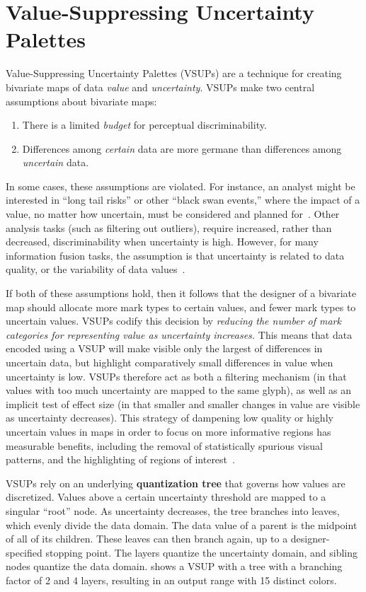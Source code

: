 \section{Value-Suppressing Uncertainty Palettes}
Value-Suppressing Uncertainty Palettes (VSUPs) are a technique for creating bivariate maps of data \emph{value} and \emph{uncertainty}. VSUPs make two central assumptions about bivariate maps:

\begin{enumerate}
	\item There is a limited \emph{budget} for perceptual discriminability.
	\item Differences among \emph{certain} data are more germane than differences among \emph{uncertain} data.
\end{enumerate}

In some cases, these assumptions are violated. For instance, an analyst might be interested in ``long tail risks'' or other ``black swan events,'' where the impact of a value, no matter how uncertain, must be considered and planned for~\cite{taleb2011black}. Other analysis tasks (such as filtering out outliers), require increased, rather than decreased, discriminability when uncertainty is high. However, for many information fusion tasks, the assumption is that uncertainty is related to data quality, or the variability of data values~\cite{riveiro2007evaluation}.

If both of these assumptions hold, then it follows that the designer of a bivariate map should allocate more mark types to certain values, and fewer mark types to uncertain values. VSUPs codify this decision by \emph{reducing the number of mark categories for representing value as uncertainty increases.} This means that data encoded using a VSUP will make visible only the largest of differences in uncertain data, but highlight comparatively small differences in value when uncertainty is low. VSUPs therefore act as both a filtering mechanism (in that values with too much uncertainty are mapped to the same glyph), as well as an implicit test of effect size (in that smaller and smaller changes in value are visible as uncertainty decreases). This strategy of dampening low quality or highly uncertain values in maps in order to focus on more informative regions has measurable benefits, including the removal of statistically spurious visual patterns, and the highlighting of regions of interest~\cite{correll2017surprise}.

VSUPs rely on an underlying \textbf{quantization tree} that governs how values are discretized. Values above a certain uncertainty threshold are mapped to a singular ``root'' node. As uncertainty decreases, the tree branches into leaves, which evenly divide the data domain. The data value of a parent is the midpoint of all of its children. These leaves can then branch again, up to a designer-specified stopping point. The layers quantize the uncertainty domain, and sibling nodes quantize the data domain.  shows a VSUP with a tree with a branching factor of 2 and 4 layers, resulting in an output range with 15 distinct colors.

